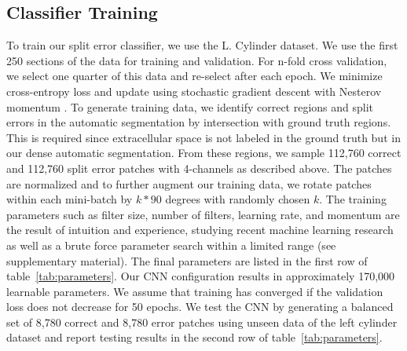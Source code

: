\subsection{Classifier Training}

To train our split error classifier, we use the L. Cylinder dataset. We use the first 250 sections of the data for training and validation. For n-fold cross validation, we select one quarter of this data and re-select after each epoch. We minimize cross-entropy loss and update using stochastic gradient descent with Nesterov momentum \cite{nesterov}.
To generate training data, we identify correct regions and split errors in the automatic segmentation by intersection with ground truth regions. This is required since extracellular space is not labeled in the ground truth but in our dense automatic segmentation. 
From these regions, we sample 112,760 correct and 112,760 split error patches with 4-channels as described above. The patches are normalized and to further augment our training data, we rotate patches within each mini-batch by $k*90$ degrees with randomly chosen $k$. The training parameters such as filter size, number of filters, learning rate, and momentum are the result of intuition and experience, studying recent machine learning research as well as a brute force parameter search within a limited range (see supplementary material). 
The final parameters are listed in the first row of table~\ref{tab:parameters}. Our CNN configuration results in approximately 170,000 learnable parameters. We assume that training has converged if the validation loss does not decrease for 50 epochs. We test the CNN by generating a balanced set of 8,780 correct and 8,780 error patches using unseen data of the left cylinder dataset and report testing results in the second row of table~\ref{tab:parameters}.

